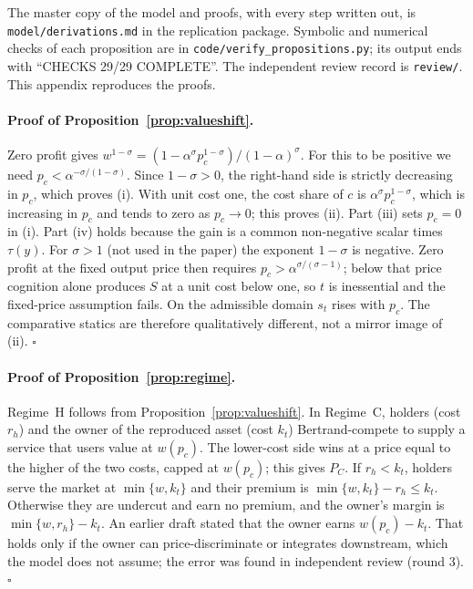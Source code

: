 \documentclass[12pt]{article}
\theoremstyle{remark}
\begin{document}
The master copy of the model and proofs, with every step written out, is \texttt{model/derivations.md} in the replication package. Symbolic and numerical checks of each proposition are in \texttt{code/verify\_propositions.py}; its output ends with ``CHECKS 29/29 COMPLETE''. The independent review record is \texttt{review/}. This appendix reproduces the proofs.

\paragraph{Proof of Proposition~\ref{prop:valueshift}.} Zero profit gives $w^{1-\sigma}=(1-\alpha^\sigma p_c^{1-\sigma})/(1-\alpha)^\sigma$. For this to be positive we need $p_c<\alpha^{-\sigma/(1-\sigma)}$. Since $1-\sigma>0$, the right-hand side is strictly decreasing in $p_c$, which proves (i). With unit cost one, the cost share of $c$ is $\alpha^\sigma p_c^{1-\sigma}$, which is increasing in $p_c$ and tends to zero as $p_c\to0$; this proves (ii). Part (iii) sets $p_c=0$ in (i). Part (iv) holds because the gain is a common non-negative scalar times $\tau(y)$. For $\sigma>1$ (not used in the paper) the exponent $1-\sigma$ is negative. Zero profit at the fixed output price then requires $p_c>\alpha^{\sigma/(\sigma-1)}$; below that price cognition alone produces $S$ at a unit cost below one, so $t$ is inessential and the fixed-price assumption fails. On the admissible domain $s_t$ rises with $p_c$. The comparative statics are therefore qualitatively different, not a mirror image of (ii). $\square$

\paragraph{Proof of Proposition~\ref{prop:regime}.} Regime~H follows from Proposition~\ref{prop:valueshift}. In Regime~C, holders (cost $r_h$) and the owner of the reproduced asset (cost $k_t$) Bertrand-compete to supply a service that users value at $w(p_c)$. The lower-cost side wins at a price equal to the higher of the two costs, capped at $w(p_c)$; this gives $P_C$. If $r_h<k_t$, holders serve the market at $\min\{w,k_t\}$ and their premium is $\min\{w,k_t\}-r_h\le k_t$. Otherwise they are undercut and earn no premium, and the owner's margin is $\min\{w,r_h\}-k_t$. An earlier draft stated that the owner earns $w(p_c)-k_t$. That holds only if the owner can price-discriminate or integrates downstream, which the model does not assume; the error was found in independent review (round 3). $\square$
\end{document}
